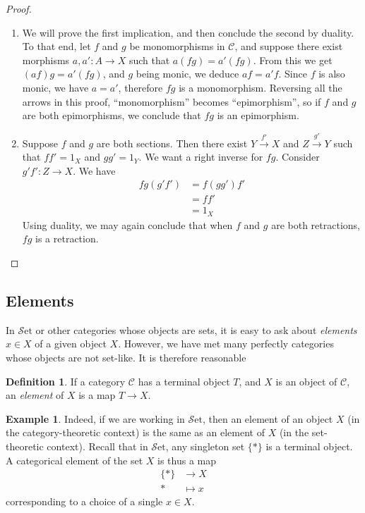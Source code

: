 \documentclass[10pt,oneside]{book}
\def\~#1{\mathscr{#1}}
\def\To#1{\xrightarrow{#1}}
\newcommand{\Set}{\~S\mathrm{et}}
\theoremstyle{plain}
\theoremstyle{definition}
\newtheorem{defn}[thm]{Definition}
\newtheorem{ex}[thm]{Example}
\theoremstyle{remark}
\numberwithin{equation}{section}
\numberwithin{figure}{section}
\begin{document}
\begin{proof}
\hfill
\begin{enumerate}[label=(\roman*)]
    \item We will prove the first implication, and then conclude the second by duality. To that end, let $f$ and $g$ be monomorphisms in $\~C$, and suppose there exist morphisms $a, a': A \to X$ such that $a(fg) = a'(fg)$. From this we get $(af)g = a'(fg)$, and $g$ being monic, we deduce $af = a'f$. Since $f$ is also monic, we have $a = a'$, therefore $fg$ is a monomorphism. Reversing all the arrows in this proof, ``monomorphism'' becomes ``epimorphism'', so if $f$ and $g$ are both epimorphisms, we conclude that $fg$ is an epimorphism.
    \item Suppose $f$ and $g$ are both sections. Then there exist $Y \To{f'} X$ and $Z \To{g'} Y$ such that $ff' = 1_X$ and $gg' = 1_Y$. We want a right inverse for $fg$. Consider $g'f': Z\to X$. We have
    \begin{align*}
        fg(g'f') &= f(gg')f' \\
                 &= ff' \\
                 &= 1_X
    \end{align*}
    Using duality, we may again conclude that when $f$ and $g$ are both retractions, $fg$ is a retraction.
\end{enumerate}        
\end{proof}

\subsection*{Elements}
In $\Set$ or other categories whose objects are sets, it is easy to ask about \emph{elements} $x \in X$ of a given object $X$. However, we have met many perfectly categories whose objects are not set-like. It is therefore reasonable 

\begin{defn}
If a category $\~C$ has a terminal object $T$, and $X$ is an object of $\~C$, an \emph{element} of $X$ is a map $T \to X$. 
\end{defn}

\begin{ex}
Indeed, if we are working in $\Set$, then an element of an object $X$ (in the category-theoretic context) is the same as an element of $X$ (in the set-theoretic context). Recall that in $\Set$, any singleton set $\{\ast\}$ is a terminal object. A categorical element of the set $X$ is thus a map
\begin{align*}
\{\ast\} &\to X\\
\ast &\mapsto x
\end{align*} 
corresponding to a choice of a single $x \in X$. 
\end{ex}
\end{document}
